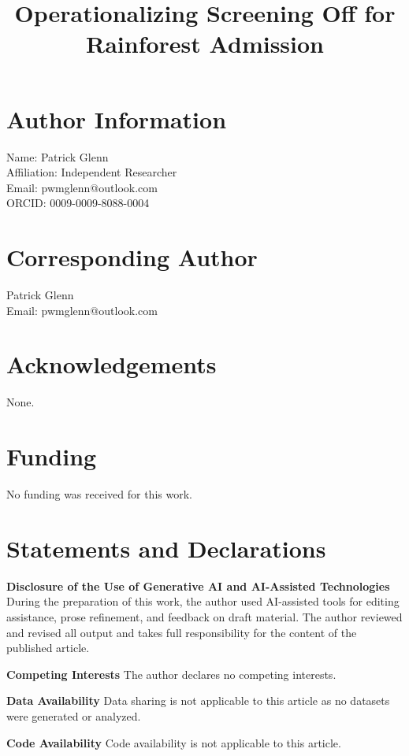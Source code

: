 \documentclass[pdflatex,sn-basic]{sn-jnl}
\begin{document}
\title[Title Page Metadata]{Operationalizing Screening Off for Rainforest Admission}

\author*[1]{ }


\maketitle

\section*{Author Information}

\noindent Name: Patrick Glenn \\
Affiliation: Independent Researcher \\
Email: pwmglenn@outlook.com \\
ORCID: 0009-0009-8088-0004

\section*{Corresponding Author}

\noindent Patrick Glenn \\
Email: pwmglenn@outlook.com

\section*{Acknowledgements}

\noindent None.

\section*{Funding}

\noindent No funding was received for this work.

\section*{Statements and Declarations}

\noindent\textbf{Disclosure of the Use of Generative AI and AI-Assisted Technologies} During the preparation of this work, the author used AI-assisted tools for editing assistance, prose refinement, and feedback on draft material. The author reviewed and revised all output and takes full responsibility for the content of the published article.

\noindent\textbf{Competing Interests} The author declares no competing interests.

\noindent\textbf{Data Availability} Data sharing is not applicable to this article as no datasets were generated or analyzed.

\noindent\textbf{Code Availability} Code availability is not applicable to this article.
\end{document}
